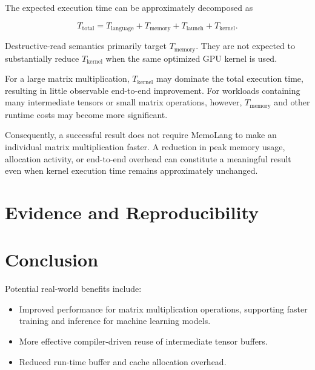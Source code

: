 \documentclass[a4paper]{article}
\begin{document}
	The expected execution time can be approximately decomposed as
	
	\begin{equation}
		T_{\mathrm{total}} =
		T_{\mathrm{language}} +
		T_{\mathrm{memory}} +
		T_{\mathrm{launch}} +
		T_{\mathrm{kernel}}.
	\end{equation}
	
	Destructive-read semantics primarily target $T_{\mathrm{memory}}$. They are not expected to substantially reduce $T_{\mathrm{kernel}}$ when the same optimized GPU kernel is used.
	
	For a large matrix multiplication, $T_{\mathrm{kernel}}$ may dominate the total execution time, resulting in little observable end-to-end improvement. For workloads containing many intermediate tensors or small matrix operations, however, $T_{\mathrm{memory}}$ and other runtime costs may become more significant.
	
	Consequently, a successful result does not require MemoLang to make an individual matrix multiplication faster. A reduction in peak memory usage, allocation activity, or end-to-end overhead can constitute a meaningful result even when kernel execution time remains approximately unchanged.
	
	
	
		
	\section{Evidence and Reproducibility}
	\label{sec:evidence}
	
	
	
	\section{Conclusion}
	
	
	Potential real-world benefits include:
	
	\begin{itemize}
		\item Improved performance for matrix multiplication operations, supporting faster training and inference for machine learning models.
		\item More effective compiler-driven reuse of intermediate tensor buffers.
		\item Reduced run-time buffer and cache allocation overhead.
	\end{itemize}
	
\end{document}
